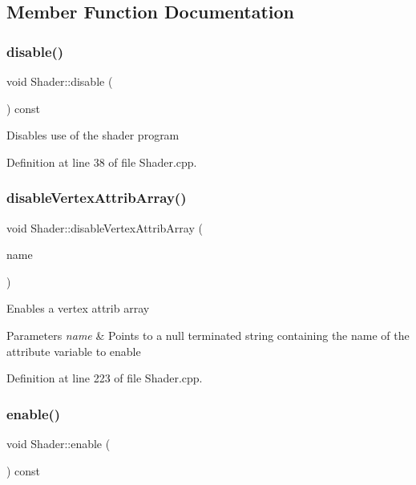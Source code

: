 \subsection{Member Function Documentation}
\mbox{\label{class_shader_af962c95adc950bd28afbc81631ad3957}} 
\subsubsection{\texorpdfstring{disable()}{disable()}}
{\footnotesize\ttfamily void Shader\+::disable (\begin{DoxyParamCaption}{ }\end{DoxyParamCaption}) const}

Disables use of the shader program 

Definition at line 38 of file Shader.\+cpp.

\mbox{\label{class_shader_a7f5da760f0edbd72487f8d7905cf4216}} 
\subsubsection{\texorpdfstring{disable\+Vertex\+Attrib\+Array()}{disableVertexAttribArray()}}
{\footnotesize\ttfamily void Shader\+::disable\+Vertex\+Attrib\+Array (\begin{DoxyParamCaption}\item[{const G\+Lchar $\ast$}]{name }\end{DoxyParamCaption})}

Enables a vertex attrib array 
\begin{DoxyParams}{Parameters}
{\em name} & Points to a null terminated string containing the name of the attribute variable to enable \\
\hline
\end{DoxyParams}


Definition at line 223 of file Shader.\+cpp.

\mbox{\label{class_shader_a048e3e3d86daff7b8f61432a866c529f}} 
\subsubsection{\texorpdfstring{enable()}{enable()}}
{\footnotesize\ttfamily void Shader\+::enable (\begin{DoxyParamCaption}{ }\end{DoxyParamCaption}) const}

